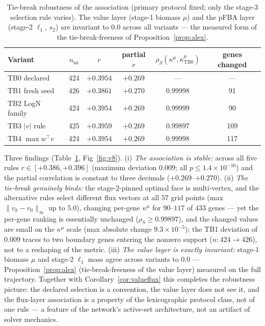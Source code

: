 \documentclass[11pt,a4paper]{article}
\theoremstyle{plain}
\theoremstyle{definition}
\theoremstyle{remark}
\newcommand{\kmu}{\kappa^{\mu}}
\begin{document}
\begin{table}[t]
\centering
\caption{Tie-break robustness of the association (primary protocol fixed; only the stage-3 selection rule varies). The value layer
(stage-1 biomass $\mu$) and the pFBA layer (stage-2 $\ell_1$, $s_2$)
are invariant to $0.0$ across all variants --- the measured form of
the tie-break-freeness of Proposition~\ref{prop:alex}.}
\label{tab:v8}
\begin{tabular}{lccccc}
\toprule
Variant & $n_{\mathrm{nz}}$ & $r$ & partial $r$ &
$\rho_S(\kmu, \kmu_{\mathrm{TB0}})$ & genes changed \\
\midrule
TB0 declared       & 424 & $+0.3954$ & $+0.269$ & --- & --- \\
TB1 fresh seed     & 426 & $+0.3861$ & $+0.270$ & $0.99998$ & 91 \\
TB2 LogN family    & 424 & $+0.3954$ & $+0.269$ & $0.99999$ & 90 \\
TB3 $|v|$ rule     & 425 & $+0.3959$ & $+0.269$ & $0.99897$ & 109 \\
TB4 $\max w^\top v$& 424 & $+0.3954$ & $+0.269$ & $0.99998$ & 117 \\
\bottomrule
\end{tabular}
\end{table}

Three findings (Table~\ref{tab:v8}, Fig~\ref{fig:v8}). (i) \emph{The association is
stable:} across all five rules $r \in [+0.386, +0.396]$ (maximum
deviation $0.009$; all $p \le 1.4 \times 10^{-16}$) and the partial
correlation is constant to three decimals ($+0.269$--$+0.270$). (ii)
\emph{The tie-break genuinely binds:} the stage-2-pinned optimal face
is multi-vertex, and the alternative rules select different flux
vectors at all $57$ grid points (max $\|v_k - v_0\|_\infty$ up to
$5.0$), changing per-gene $\kmu$ for $90$--$117$ of $433$ genes ---
yet the per-gene ranking is essentially unchanged
($\rho_S \ge 0.99897$), and the changed values are small on the
$\kmu$ scale (max absolute change $9.3 \times 10^{-5}$); the TB1
deviation of $0.009$ traces to two boundary genes entering the
nonzero support ($n: 424 \to 426$), not to a reshaping of the metric.
(iii) \emph{The value layer is exactly invariant:} stage-1 biomass
$\mu$ and stage-2 $\ell_1$ mass agree across variants to $0.0$ ---
Proposition~\ref{prop:alex} (tie-break-freeness of the value layer)
measured on the full trajectory. Together with
Corollary~\ref{cor:valueflux} this completes the robustness picture: the
declared selection is a convention, the value layer does not see it,
and the flux-layer association is a property of the lexicographic
protocol class, not of one rule --- a feature of the network's
active-set architecture, not an artifact of solver mechanics.
\end{document}
